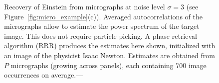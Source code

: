 \documentclass[english,11pt]{article}
\newcommand{\1}{\mathbf{1}}
\newcommand{\TODO}[1]{{\color{red}{[#1]}}}
\numberwithin{equation}{section}
\theoremstyle{plain}
\theoremstyle{definition}
\theoremstyle{remark}
\theoremstyle{plain}
\theoremstyle{remark}
\theoremstyle{plain}
\theoremstyle{plain}
\newcommand{\SNR}{\ensuremath{\textsf{SNR}}}
\begin{document}
\begin{figure}[h!]

	\caption{\label{fig:Einst_example} Recovery of Einstein from micrographs at noise level $\sigma = 3$ (see Figure~\ref{fig:micro_example}(c)). Averaged autocorrelations of the micrographs allow to estimate the power spectrum of the target image. This does not require particle picking. A phase retrieval algorithm (RRR) produces the estimates here shown, initialized with an image of the physicist Isaac Newton. Estimates are obtained from $P$ micrographs (growing across panels), each containing $700$ image occurrences on average.---\TODO{We may want to add another image with $P=512\times 10^4$ and the image of Newton.}
	}
\end{figure}
\end{document}

